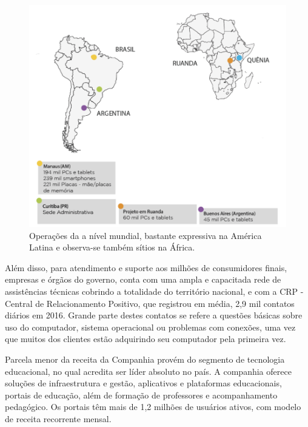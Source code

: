 \begin{figure}[h]
\begin{centering}
\includegraphics[width=1.0\textwidth]{Img/PositivoMundo}
\caption{Operações da \nomePositivo{} a nível mundial, bastante expressiva na América Latina e observa-se também sítios na África.}
\par\end{centering}
\end{figure}

Além disso, para atendimento e suporte aos milhões de consumidores finais, empresas e órgãos do governo, conta com uma ampla e capacitada rede de assistências técnicas cobrindo a totalidade do território nacional, e com a CRP - Central de Relacionamento Positivo, que registrou em média, 2,9 mil contatos diários em 2016. Grande parte destes contatos se refere a questões básicas sobre uso do computador, sistema operacional ou problemas com conexões, uma vez que muitos dos clientes estão adquirindo seu computador pela primeira vez.

Parcela menor da receita da Companhia provém do segmento de tecnologia educacional, no qual acredita ser líder absoluto no país. A companhia oferece soluções de infraestrutura e gestão, aplicativos e plataformas educacionais, portais de educação, além de formação de professores e acompanhamento pedagógico. Os portais têm mais de 1,2 milhões de usuários ativos, com modelo de receita recorrente mensal\cite{historico2018}. 

